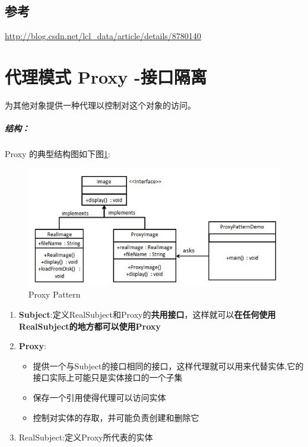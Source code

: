 \documentclass[UTF8,a4paper,12pt]{ctexbook}
\begin{document}
	\subsection{参考}
		\url{http://blog.csdn.net/lcl_data/article/details/8780140}
		

\newpage
\section{代理模式 Proxy -接口隔离}
	为其他对象提供一种代理以控制对这个对象的访问。
	
	\subparagraph{结构：}Proxy 的典型结构图如下图\ref{Proxy}:
	\begin{figure}[h]
		\centering
		\includegraphics[scale= 0.7]{Proxy.jpg}
		\caption{Proxy Pattern}
		\label{Proxy}
	\end{figure}
	
	\begin{enumerate}[itemindent = 1em]
		\item \textbf{Subject}:定义RealSubject和Proxy的\textbf{共用接口}，这样就可以\textbf{在任何使用RealSubject的地方都可以使用Proxy}
		\item \textbf{Proxy}:
			\begin{itemize}
				\item 提供一个与Subject的接口相同的接口，这样代理就可以用来代替实体,它的接口实际上可能只是实体接口的一个子集
				\item 保存一个引用使得代理可以访问实体
				\item 控制对实体的存取，并可能负责创建和删除它
			\end{itemize}
		\item RealSubject:定义Proxy所代表的实体
	\end{enumerate}	
	
\end{document}
